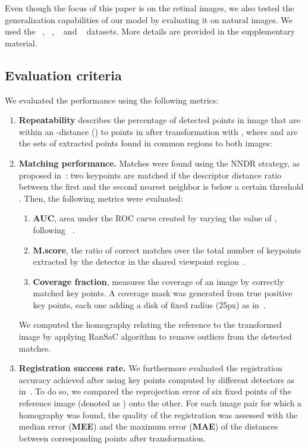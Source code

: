 Even though the focus of this paper is on the retinal images, we also tested the generalization capabilities of our model by evaluating it on natural images. We used the ~\cite{oxford}, ~\cite{Zitnik}, ~\cite{Verdie2015, Jacobs2007} and ~\cite{Yi2015} datasets. More details are provided in the supplementary material.

\subsection{Evaluation criteria}

We evaluated the performance using the following metrics:
\begin{enumerate}
    \item \textbf{Repeatability} describes the percentage of detected points  in image  that are within an -distance () to points  in  after transformation with , where  and  are the sets of extracted points found in common regions to both images:



    \item \textbf{Matching performance.} Matches were found using the \ac{NNDR} strategy, as proposed in~\cite{Lowe2004}: two keypoints are matched if the descriptor distance ratio between the first and the second nearest neighbor is below a certain threshold .  Then, the following metrics were evaluated:
    
\begin{enumerate}[label=(\alph*)]
    \item \textbf{AUC}, area under the ROC curve created by varying the value of , following ~\cite{Dahl2011,Winder,Windera}.  
    
    \item \textbf{M.score}, the ratio of correct matches over the total number of keypoints extracted by the detector in the shared viewpoint region~\cite{Mikolajczyk2005}.
    
    \item \textbf{Coverage fraction}, measures the coverage of an image by correctly matched key points. A coverage mask was generated from true positive key points, each one adding a disk of fixed radius (25px) as in~\cite{Aldana-iuit}. 
\end{enumerate}

We computed the homography  relating the reference to the transformed image  by applying \ac{RanSaC} algorithm to remove outliers from the detected matches.

\item \textbf{Registration success rate.} We furthermore evaluated the  registration accuracy achieved after using key points computed by different detectors as in~\cite{Chen2010,Wang2015}.  To do so, we compared the reprojection error of six fixed points of the reference image (denoted as ) onto the other. For each image pair for which a homography was found, the quality of the registration was assessed with 
the median error (\textbf{MEE}) and the maximum error (\textbf{MAE}) of the distances between corresponding points after transformation.



\end{enumerate}
